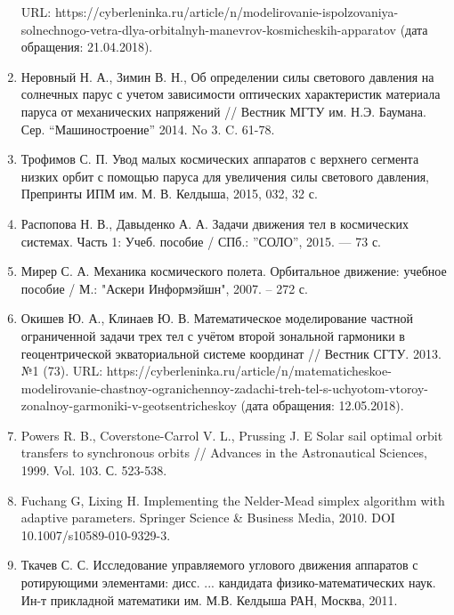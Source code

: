 \begin{enumerate}
URL: https://cyberleninka.ru/article/n/modelirovanie-ispolzovaniya-solnechnogo-vetra-dlya-orbitalnyh-manevrov-kosmicheskih-apparatov (дата обращения: 21.04.2018).
    \item Неровный Н. А., Зимин В. Н., Об определении силы светового давления на солнечных парус
с учетом зависимости оптических характеристик материала паруса от механических напряжений //
Вестник МГТУ им. Н.Э. Баумана. Сер. “Машиностроение” 2014. No 3. C. 61-78.
    \item Трофимов С. П. Увод малых космических аппаратов с верхнего сегмента низких орбит
с помощью паруса для увеличения силы светового давления, Препринты ИПМ им. М. В. Келдыша, 2015, 032, 32 с.
    \item Распопова Н. В., Давыденко А. А. Задачи движения тел в космических системах.
Часть 1: Учеб. пособие / СПб.: ”СОЛО”, 2015. — 73 с.
    \item Мирер С. А. Механика космического полета. Орбитальное движение: учебное пособие /
М.: "Аскери Информэйшн", 2007. -- 272 с.
    \item Окишев Ю. А., Клинаев Ю. В. Математическое моделирование частной ограниченной
задачи трех тел с учётом второй зональной гармоники в геоцентрической экваториальной
системе координат // Вестник СГТУ. 2013. №1 (73). URL:
https://cyberleninka.ru/article/n/matematicheskoe-modelirovanie-chastnoy-ogranichennoy-zadachi-treh-tel-s-uchyotom-vtoroy-zonalnoy-garmoniki-v-geotsentricheskoy
(дата обращения: 12.05.2018).
    \item Powers R. B., Coverstone-Carrol V. L., Prussing J. E Solar sail optimal
orbit transfers to synchronous orbits // Advances in the Astronautical Sciences, 1999. Vol. 103. С. 523-538.
    \item Fuchang G, Lixing H. Implementing the Nelder-Mead simplex algorithm
with adaptive parameters. Springer Science \& Business Media, 2010. DOI 10.1007/s10589-010-9329-3.
    \item Ткачев С. С. Исследование управляемого углового движения аппаратов с
ротирующими элементами: дисс. ... кандидата физико-математических наук. Ин-т прикладной математики им. М.В. Келдыша РАН,
Москва, 2011.
\end{enumerate}

